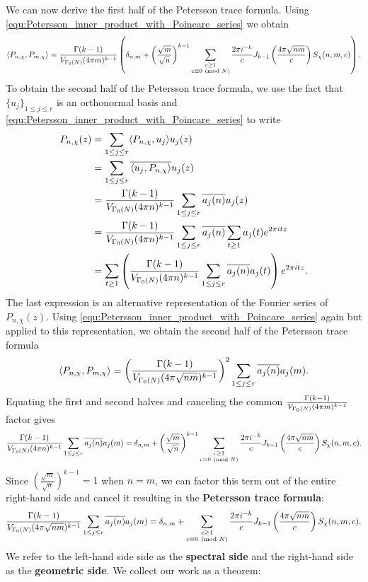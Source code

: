     We can now derive the first half of the Petersson trace formula. Using \cref{equ:Petersson_inner_product_with_Poincare_series} we obtain
    \[
      \langle P_{n,\chi},P_{m,\chi}\rangle = \frac{\Gamma(k-1)}{V_{\Gamma_{0}(N)}(4\pi m)^{k-1}}\left(\delta_{n,m}+\left(\frac{\sqrt{m}}{\sqrt{n}}\right)^{k-1}\sum_{\substack{c \ge 1 \\ c \equiv 0 \ \left(\text{mod }N\right)}}\frac{2\pi i^{-k}}{c}J_{k-1}\left(\frac{4\pi\sqrt{nm}}{c}\right)S_{\chi}(n,m,c)\right).
    \]
    To obtain the second half of the Petersson trace formula, we use the fact that $\{u_{j}\}_{1 \le j \le r}$ is an orthonormal basis and \cref{equ:Petersson_inner_product_with_Poincare_series} to write
    \begin{align*}
      P_{n,\chi}(z) &= \sum_{1 \le j \le r}\langle P_{n,\chi},u_{j}\rangle u_{j}(z) \\
      &= \sum_{1 \le j \le r}\overline{\langle u_{j},P_{n,\chi}\rangle}u_{j}(z) \\
      &= \frac{\Gamma(k-1)}{V_{\Gamma_{0}(N)}(4\pi n)^{k-1}}\sum_{1 \le j \le r}\overline{a_{j}(n)}u_{j}(z) \\
      &= \frac{\Gamma(k-1)}{V_{\Gamma_{0}(N)}(4\pi n)^{k-1}}\sum_{1 \le j \le r}\overline{a_{j}(n)}\sum_{t \ge 1}a_{j}(t)e^{2\pi itz} \\
      &= \sum_{t \ge 1}\left(\frac{\Gamma(k-1)}{V_{\Gamma_{0}(N)}(4\pi n)^{k-1}}\sum_{1 \le j \le r}\overline{a_{j}(n)}a_{j}(t)\right)e^{2\pi itz}.
    \end{align*}
    The last expression is an alternative representation of the Fourier series of $P_{n,\chi}(z)$. Using \cref{equ:Petersson_inner_product_with_Poincare_series} again but applied to this representation, we obtain the second half of the Petersson trace formula
    \[
      \langle P_{n,\chi},P_{m,\chi}\rangle = \left(\frac{\Gamma(k-1)}{V_{\Gamma_{0}(N)}(4\pi \sqrt{nm})^{k-1}}\right)^{2}\sum_{1 \le j \le r}\overline{a_{j}(n)}a_{j}(m).
    \]
    Equating the first and second halves and canceling the common $\frac{\Gamma(k-1)}{V_{\Gamma_{0}(N)}(4\pi m)^{k-1}}$ factor gives
    \[
      \frac{\Gamma(k-1)}{V_{\Gamma_{0}(N)}(4\pi n)^{k-1}}\sum_{1 \le j \le r}\overline{a_{j}(n)}a_{j}(m) = \delta_{n,m}+\left(\frac{\sqrt{m}}{\sqrt{n}}\right)^{k-1}\sum_{\substack{c \ge 1 \\ c \equiv 0 \ \left(\text{mod }N\right)}}\frac{2\pi i^{-k}}{c}J_{k-1}\left(\frac{4\pi\sqrt{nm}}{c}\right)S_{\chi}(n,m,c).
    \]
    Since $\left(\frac{\sqrt{m}}{\sqrt{n}}\right)^{k-1} = 1$ when $n = m$, we can factor this term out of the entire right-hand side and cancel it resulting in the \textbf{Petersson trace formula}:
    \[
      \frac{\Gamma(k-1)}{V_{\Gamma_{0}(N)}(4\pi\sqrt{nm})^{k-1}}\sum_{1 \le j \le r}\overline{a_{j}(n)}a_{j}(m) = \delta_{n,m}+\sum_{\substack{c \ge 1 \\ c \equiv 0 \ \left(\text{mod }N\right)}}\frac{2\pi i^{-k}}{c}J_{k-1}\left(\frac{4\pi\sqrt{nm}}{c}\right)S_{\chi}(n,m,c).
    \]
    We refer to the left-hand side side as the \textbf{spectral side} and the right-hand side as the \textbf{geometric side}. We collect our work as a theorem:

